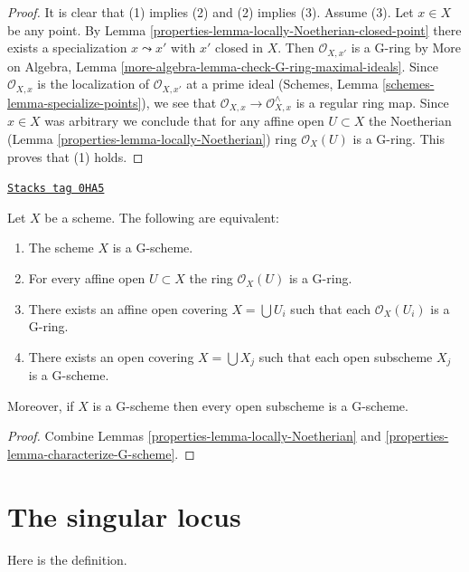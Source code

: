 \begin{proof}

It is clear that (1) implies (2) and (2) implies (3).
Assume (3). Let $x \in X$ be any point. By
Lemma \ref{properties-lemma-locally-Noetherian-closed-point}
there exists a specialization $x \leadsto x'$ with $x'$ closed
in $X$. Then $\mathcal{O}_{X, x'}$ is a G-ring by
More on Algebra, Lemma \ref{more-algebra-lemma-check-G-ring-maximal-ideals}.
Since $\mathcal{O}_{X, x}$ is the localization of $\mathcal{O}_{X, x'}$
at a prime ideal (Schemes, Lemma \ref{schemes-lemma-specialize-points}),
we see that $\mathcal{O}_{X, x} \to \mathcal{O}_{X, x}^\wedge$
is a regular ring map. Since $x \in X$ was arbitrary we conclude
that for any affine open $U \subset X$ the Noetherian
(Lemma \ref{properties-lemma-locally-Noetherian}) ring $\mathcal{O}_X(U)$ is a G-ring.
This proves that (1) holds.
\end{proof}

\begin{lemma}
\label{properties-lemma-locally-G-scheme}
\href{https://stacks.math.columbia.edu/tag/0HA5}{\texttt{Stacks tag 0HA5}}

Let $X$ be a scheme. The following are equivalent:
\begin{enumerate}
\item The scheme $X$ is a G-scheme.
\item For every affine open $U \subset X$ the ring $\mathcal{O}_X(U)$
is a G-ring.
\item There exists an affine open covering $X = \bigcup U_i$ such that
each $\mathcal{O}_X(U_i)$ is a G-ring.
\item There exists an open covering $X = \bigcup X_j$
such that each open subscheme $X_j$ is a G-scheme.
\end{enumerate}
Moreover, if $X$ is a G-scheme then every open subscheme is a
G-scheme.
\end{lemma}

\begin{proof}

Combine Lemmas \ref{properties-lemma-locally-Noetherian}
and \ref{properties-lemma-characterize-G-scheme}.
\end{proof}

\section{The singular locus}
\label{properties-section-singular-locus}
Here is the definition.

